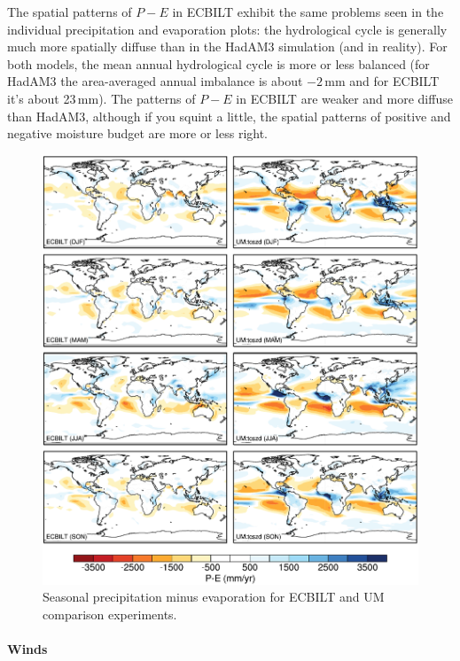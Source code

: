\documentclass[a4paper,11pt,article]{article}
\begin{document}
The spatial patterns of $P-E$ in ECBILT exhibit the same problems seen
in the individual precipitation and evaporation plots: the
hydrological cycle is generally much more spatially diffuse than in
the HadAM3 simulation (and in reality).  For both models, the mean
annual hydrological cycle is more or less balanced (for HadAM3 the
area-averaged annual imbalance is about $-2$\,mm and for ECBILT it's
about 23\,mm).  The patterns of $P-E$ in ECBILT are weaker and more
diffuse than HadAM3, although if you squint a little, the spatial
patterns of positive and negative moisture budget are more or less
right.

\begin{figure}
  \begin{center}
    \includegraphics[width=\textwidth]{../expt-1/plots/pmine-plots}
  \end{center}
  \caption{Seasonal precipitation minus evaporation for ECBILT and UM
    comparison experiments.}
  \label{fig:pmine}
\end{figure}

\paragraph{Winds}
\end{document}
